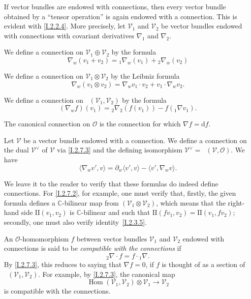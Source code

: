 \documentclass{report}
\theoremstyle{plain}
\theoremstyle{definition}
\newenvironment{env}[1]
    {\renewcommand\theinnercustomenv{#1}\innercustomenv}
    {\endinnercustomenv}
\newcommand{\sh}[1]{{\mathscr{#1}}}
\newcommand{\dd}{\mathrm{d}}
\newcommand{\II}{\mathrm{II}}
\DeclareMathOperator{\Hom}{Hom}
\DeclareMathOperator{\shHom}{\underline{Hom}}
\newcommand{\oldpage}[1]{\marginpar{\footnotesize$\Big\vert$ \textit{p.~#1}}}
\begin{document}
\begin{env}{2.7}
\label{I.2.7}
  If vector bundles are endowed with connections, then every vector bundle obtained by a ``tensor operation'' is again endowed with a connection.
  This is evident with \cref{I.2.2.4}.
  More precisely, let $\sh{V}_1$ and $\sh{V}_2$ be vector bundles endowed with connections with covariant derivatives $\nabla_1$ and $\nabla_2$.

  \begin{env}{2.7.1}
  \label{I.2.7.1}
    We define a connection on $\sh{V}_1\oplus\sh{V}_2$ by the formula
    \[
      \nabla_w(v_1+v_2) = {}_1\!\nabla_w(v_1) + {}_2\!\nabla_w(v_2)
    \]
  \end{env}

  \begin{env}{2.7.2}
  \label{I.2.7.2}
    We define a connection on $\sh{V}_1\otimes\sh{V}_2$ by the Leibniz formula
    \[
      \nabla_w(v_1\otimes v_2) = \nabla_w v_1\cdot v_2 + v_1\cdot\nabla_w v_2.
    \]
  \end{env}

  \begin{env}{2.7.3}
  \label{I.2.7.3}
    We define a connection on $\shHom(\sh{V}_1,\sh{V}_2)$ by the formula
    \[
      (\nabla_w f)(v_1) = {}_2\!\nabla_2(f(v_1)) - f({}_1\!\nabla v_1).
    \]
  \end{env}

  The canonical connection on $\sh{O}$ is the connection for which $\nabla f=\dd f$.
  
  Let $\sh{V}$ be a vector bundle endowed with a connection.
  \begin{env}{2.7.4}
  \label{I.2.7.4}
    We define a connection on the dual $\sh{V}^\vee$ of $\sh{V}$ via \cref{I.2.7.3} and the defining isomorphism $\sh{V}^\vee = \shHom(\sh{V},\sh{O})$.
    We have
    \[
      \langle \nabla_w v',v \rangle = \partial_w\langle v',v \rangle - \langle v',\nabla_w v \rangle.
    \]
  \end{env}

  We leave it to the reader to verify that these formulas do indeed define connections.
  For \cref{I.2.7.2}, for example, one must verify that, firstly, the given formula defines a $\mathbb{C}$-bilinear map from $(\sh{V}_1\otimes\sh{V}_2)$, which means that the right-hand side $\II(v_1,v_2)$ is $\mathbb{C}$-bilinear and such that $\II(fv_1,v_2)=\II(v_1,fv_2)$;
  secondly, one must also verify identity~\cref{I.2.3.5}.
\end{env}

\begin{env}{2.8}
\label{I.2.8}
  An $\sh{O}$-homomorphism $f$ between vector bundles $\sh{V}_1$ and $\sh{V}_2$ endowed with connections
\oldpage{9}
  is said to be \emph{compatible with the connections} if
  \[
    {}_2\!\nabla\cdot f = f\cdot{}_1\!\nabla.
  \]
  By \cref{I.2.7.3}, this reduces to saying that $\nabla f=0$, if $f$ is thought of as a section of $\shHom(\sh{V}_1,\sh{V}_2)$.
  For example, by \cref{I.2.7.3}, the canonical map
  \[
    \Hom(\sh{V}_1,\sh{V}_2)\otimes\sh{V}_1 \to \sh{V}_2
  \]
  is compatible with the connections.
\end{env}
\end{document}
